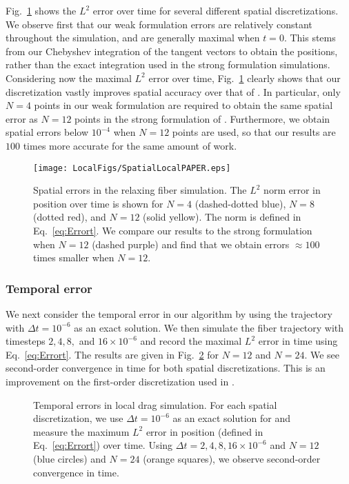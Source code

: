 Fig.\ \ref{fig:locspatial} shows the $L^2$ error over time for several different spatial discretizations. We observe first that our weak formulation errors are relatively constant throughout the simulation, and are generally maximal when $t=0$. This stems from our Chebyshev integration of the tangent vectors to obtain the positions, rather than the exact integration used in the strong formulation simulations. Considering now the maximal $L^2$ error over time, Fig.\ \ref{fig:locspatial} clearly shows that our discretization vastly improves spatial accuracy over that of \cite{ehssan17}. In particular, only $N=4$ points in our weak formulation are required to obtain the same spatial error as $N=12$ points in the strong formulation of \cite{ehssan17}. Furthermore, we obtain spatial errors below $10^{-4}$ when $N=12$ points are used, so that our results are $100$ times more accurate for the same amount of work. 


\begin{figure}
\centering 
\texttt{[image: LocalFigs/SpatialLocalPAPER.eps]}
\caption{\label{fig:locspatial}Spatial errors in the relaxing fiber simulation. The $L^2$ norm error in position over time is shown for $N=4$ (dashed-dotted blue), $N=8$ (dotted red), and $N=12$ (solid yellow). The norm is defined in Eq.\ \eqref{eq:Errort}. We compare our results to the strong formulation when $N=12$ (dashed purple) and find that we obtain errors $\approx 100$ times smaller when $N=12$. } 
\end{figure}

\subsubsection{Temporal error}
We next consider the temporal error in our algorithm by using the trajectory with $\Delta t = 10^{-6}$ as an exact solution. We then simulate the fiber trajectory with timesteps $2, 4, 8, $ and $16 \times 10^{-6}$ and record the maximal $L^2$ error in time using Eq.\ \eqref{eq:Errort}. The results are given in Fig.\ \ref{fig:loctemporal} for $N=12$ and $N=24$. We see second-order convergence in time for both spatial discretizations. This is an improvement on the first-order discretization used in \cite{ehssan17}. 

\begin{figure}
\centering
{}
\caption{\label{fig:loctemporal}Temporal errors in local drag simulation. For each spatial discretization, we use $\Delta t=10^{-6}$ as an exact solution for and measure the maximum $L^2$  error in position (defined in Eq.\ \eqref{eq:Errort}) over time. Using $\Delta t = 2, 4, 8, 16 \times 10^{-6}$ and $N=12$ (blue circles) and $N=24$ (orange squares), we observe second-order convergence in time.  } 
\end{figure}